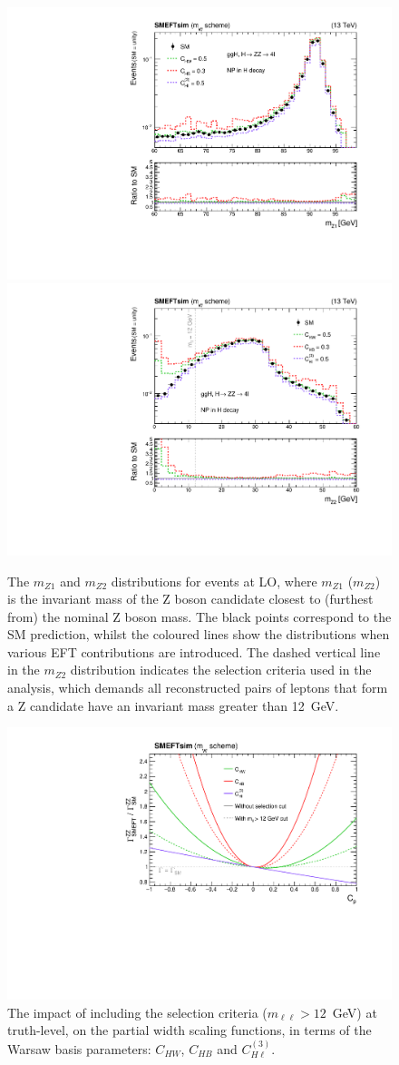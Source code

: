 \begin{figure}[htb!]
  \centering
  \includegraphics[width=.49\textwidth]{Figures/eft/distributions/M1.pdf}
  \includegraphics[width=.49\textwidth]{Figures/eft/distributions/M2.pdf}
  \caption[Kinematic distributions in the \Hfl decay channel]
  {
    The $m_{Z1}$ and $m_{Z2}$ distributions for \Hfl events at LO, where $m_{Z1}$ ($m_{Z2}$) is the invariant mass of the Z boson candidate closest to (furthest from) the nominal Z boson mass. The black points correspond to the SM prediction, whilst the coloured lines show the distributions when various EFT contributions are introduced. The dashed vertical line in the $m_{Z2}$ distribution indicates the selection criteria used in the \Hfl analysis, which demands all reconstructed pairs of leptons that form a Z candidate have an invariant mass greater than 12~GeV.
  }
  \label{fig:acceptance_h4l}
\end{figure}

\begin{figure}[htb!]
  \centering
  \includegraphics[width=.7\textwidth]{Figures/eft/scaling_functions/sf_hzz_acceptance.pdf}
  \caption[Acceptance effects in the \Hfl partial width]
  {
    The impact of including the selection criteria ($m_{\ell\ell}>12$~GeV) at truth-level, on the \Hfl partial width scaling functions, in terms of the Warsaw basis parameters: $C_{HW}$, $C_{HB}$ and $C^{(3)}_{H\ell}$.
  }
  \label{fig:acceptance_h4l_sf}
\end{figure}


